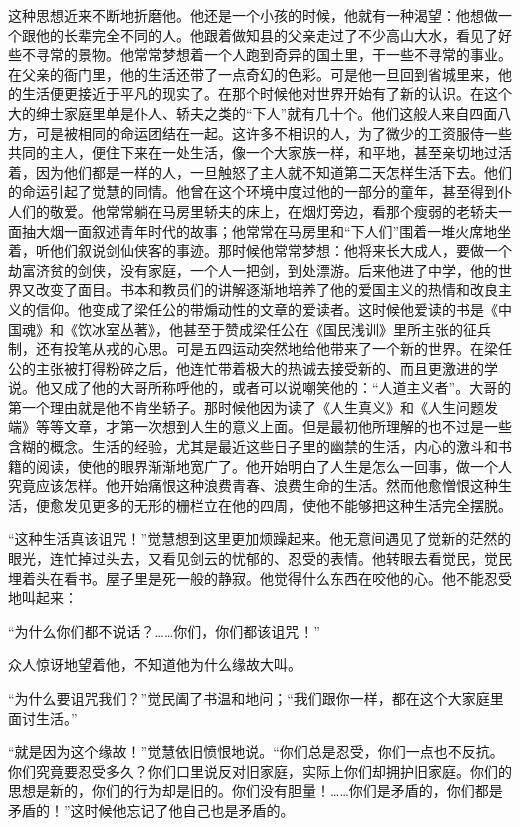 \par 这种思想近来不断地折磨他。他还是一个小孩的时候，他就有一种渴望：他想做一个跟他的长辈完全不同的人。他跟着做知县的父亲走过了不少高山大水，看见了好些不寻常的景物。他常常梦想着一个人跑到奇异的国土里，干一些不寻常的事业。在父亲的衙门里，他的生活还带了一点奇幻的色彩。可是他一旦回到省城里来，他的生活便更接近于平凡的现实了。在那个时候他对世界开始有了新的认识。在这个大的绅士家庭里单是仆人、轿夫之类的“下人”就有几十个。他们这般人来自四面八方，可是被相同的命运团结在一起。这许多不相识的人，为了微少的工资服侍一些共同的主人，便住下来在一处生活，像一个大家族一样，和平地，甚至亲切地过活着，因为他们都是一样的人，一旦触怒了主人就不知道第二天怎样生活下去。他们的命运引起了觉慧的同情。他曾在这个环境中度过他的一部分的童年，甚至得到仆人们的敬爱。他常常躺在马房里轿夫的床上，在烟灯旁边，看那个瘦弱的老轿夫一面抽大烟一面叙述青年时代的故事；他常常在马房里和“下人们”围着一堆火席地坐着，听他们叙说剑仙侠客的事迹。那时候他常常梦想：他将来长大成人，要做一个劫富济贫的剑侠，没有家庭，一个人一把剑，到处漂游。后来他进了中学，他的世界又改变了面目。书本和教员们的讲解逐渐地培养了他的爱国主义的热情和改良主义的信仰。他变成了梁任公的带煽动性的文章的爱读者。这时候他爱读的书是《中国魂》和《饮冰室丛著》，他甚至于赞成梁任公在《国民浅训》里所主张的征兵制，还有投笔从戎的心思。可是五四运动突然地给他带来了一个新的世界。在梁任公的主张被打得粉碎之后，他连忙带着极大的热诚去接受新的、而且更激进的学说。他又成了他的大哥所称呼他的，或者可以说嘲笑他的：“人道主义者”。大哥的第一个理由就是他不肯坐轿子。那时候他因为读了《人生真义》和《人生问题发端》等等文章，才第一次想到人生的意义上面。但是最初他所理解的也不过是一些含糊的概念。生活的经验，尤其是最近这些日子里的幽禁的生活，内心的激斗和书籍的阅读，使他的眼界渐渐地宽广了。他开始明白了人生是怎么一回事，做一个人究竟应该怎样。他开始痛恨这种浪费青春、浪费生命的生活。然而他愈憎恨这种生活，便愈发见更多的无形的栅栏立在他的四周，使他不能够把这种生活完全摆脱。
\par “这种生活真该诅咒！”觉慧想到这里更加烦躁起来。他无意间遇见了觉新的茫然的眼光，连忙掉过头去，又看见剑云的忧郁的、忍受的表情。他转眼去看觉民，觉民埋着头在看书。屋子里是死一般的静寂。他觉得什么东西在咬他的心。他不能忍受地叫起来：
\par “为什么你们都不说话？……你们，你们都该诅咒！”
\par 众人惊讶地望着他，不知道他为什么缘故大叫。
\par “为什么要诅咒我们？”觉民阖了书温和地问；“我们跟你一样，都在这个大家庭里面讨生活。”
\par “就是因为这个缘故！”觉慧依旧愤恨地说。“你们总是忍受，你们一点也不反抗。你们究竟要忍受多久？你们口里说反对旧家庭，实际上你们却拥护旧家庭。你们的思想是新的，你们的行为却是旧的。你们没有胆量！……你们是矛盾的，你们都是矛盾的！”这时候他忘记了他自己也是矛盾的。
